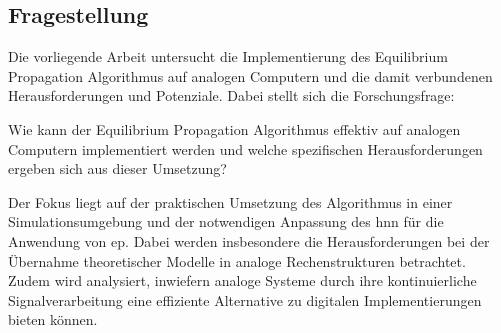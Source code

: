 \subsection{Fragestellung}

Die vorliegende Arbeit untersucht die Implementierung des Equilibrium Propagation Algorithmus auf analogen Computern und die damit verbundenen Herausforderungen und Potenziale. Dabei stellt sich die Forschungsfrage:

Wie kann der Equilibrium Propagation Algorithmus effektiv auf analogen Computern implementiert werden und welche spezifischen Herausforderungen ergeben sich aus dieser Umsetzung?

Der Fokus liegt auf der praktischen Umsetzung des Algorithmus in einer Simulationsumgebung und der notwendigen Anpassung des \ac{hnn} für die Anwendung von \ac{ep}. Dabei werden insbesondere die Herausforderungen bei der Übernahme theoretischer Modelle in analoge Rechenstrukturen betrachtet. Zudem wird analysiert, inwiefern analoge Systeme durch ihre kontinuierliche Signalverarbeitung eine effiziente Alternative zu digitalen Implementierungen bieten können.
